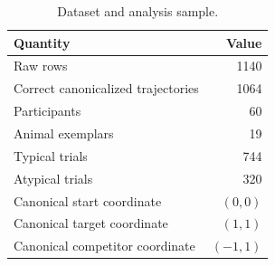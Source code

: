 \begin{table}[htbp]
\centering
\caption{Dataset and analysis sample.}
\label{tab:dataset}
\begin{tabular}{l r}
\toprule
Quantity & Value \\
\midrule
Raw rows & 1140 \\
Correct canonicalized trajectories & 1064 \\
Participants & 60 \\
Animal exemplars & 19 \\
Typical trials & 744 \\
Atypical trials & 320 \\
Canonical start coordinate & $(0,0)$ \\
Canonical target coordinate & $(1,1)$ \\
Canonical competitor coordinate & $(-1,1)$ \\
\bottomrule
\end{tabular}
\end{table}
